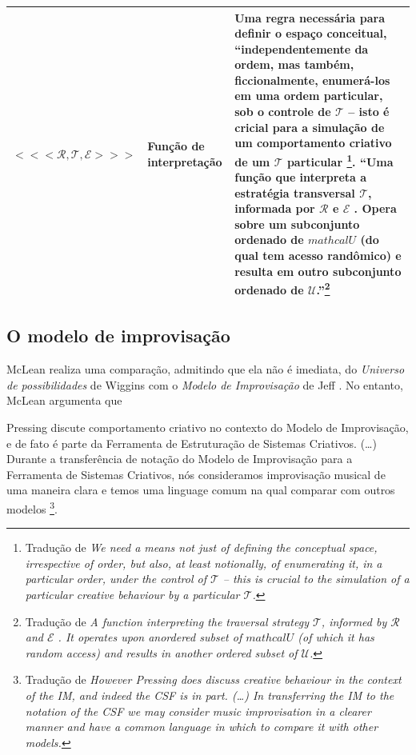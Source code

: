 \begin{table}[!h]
\begin{tabular}{ | p{4cm} | p{5.5cm} | p{5.5cm} |}
    $<<<\mathcal{R}, \mathcal{T}, \mathcal{E}>>>$
    & \tiny{Função de interpretação} 
    & \tiny{Uma regra necessária para definir o espaço conceitual, ``independentemente da ordem, mas também, ficcionalmente, enumerá-los em uma ordem particular, sob o controle de $\mathcal{T}$ -- isto é cricial para a simulação de um comportamento criativo de um $\mathcal{T}$ particular \cite{wiggins_framework_2006} \footnote{Tradução de \emph{We need a means not just of defining the conceptual space, irrespective of order, but also, at least notionally, of enumerating it, in a particular order, under the control of $\mathcal{T}$ -- this is crucial to the simulation of a particular creative behaviour by a particular $\mathcal{T}$.}}. ``Uma função que interpreta a estratégia transversal $\mathcal{T}$, informada por $\mathcal{R}$ e $\mathcal{E}$ . Opera sobre um subconjunto ordenado de $mathcal{U}$ (do qual tem acesso randômico) e resulta em outro subconjunto ordenado de $\mathcal{U}$.''\footnote{Tradução de \emph{A function interpreting the traversal strategy $\mathcal{T}$, informed by $\mathcal{R}$ and $\mathcal{E}$ . It operates upon anordered subset of $mathcal{U}$ (of which it has random access) and results in another ordered subset of $\mathcal{U}$.}}} \\
    \hline
    \hline
   
    \end{tabular}
\label{tab:universodeconceitos}
\end{table}

\subsection{O modelo de improvisação}\label{sec:im}

McLean realiza uma comparação, admitindo que ela não é imediata, do \emph{Universo de possibilidades} de Wiggins com o \emph{Modelo de Improvisação} de Jeff . No entanto, McLean argumenta que  

\begin{citacao}
Pressing discute comportamento criativo no contexto do Modelo de Improvisação, e de fato é parte da Ferramenta de Estruturação de Sistemas Criativos. (\ldots) Durante a transferência de notação do Modelo de Improvisação para a Ferramenta de Sistemas Criativos, nós consideramos improvisação musical de uma maneira clara e temos uma linguage comum na qual comparar com outros modelos \footnote{Tradução de \emph{However Pressing does discuss creative behaviour in the context of the IM, and indeed the CSF is in part. (\ldots) In transferring the IM to the notation of the CSF we may consider music improvisation in a clearer manner and have a common language in which to compare it with other models.}}.
\end{citacao}

